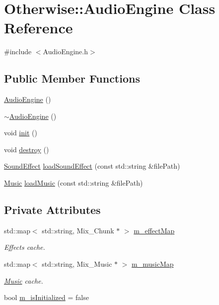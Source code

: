 \hypertarget{class_otherwise_1_1_audio_engine}{}\section{Otherwise\+:\+:Audio\+Engine Class Reference}
\label{class_otherwise_1_1_audio_engine}


{\ttfamily \#include $<$Audio\+Engine.\+h$>$}

\subsection*{Public Member Functions}
\begin{DoxyCompactItemize}
\item 
\hyperlink{class_otherwise_1_1_audio_engine_a9619c7bc4df7bdd03d35259db9ba59b7}{Audio\+Engine} ()
\item 
\hyperlink{class_otherwise_1_1_audio_engine_a4fb770e6d48751d3022512713da1c2aa}{$\sim$\+Audio\+Engine} ()
\item 
void \hyperlink{class_otherwise_1_1_audio_engine_a11a6f68e79f200d67f69bbc415f5b897}{init} ()
\item 
void \hyperlink{class_otherwise_1_1_audio_engine_a3db329073224b45ea102d52ab3e9e3a1}{destroy} ()
\item 
\hyperlink{class_otherwise_1_1_sound_effect}{Sound\+Effect} \hyperlink{class_otherwise_1_1_audio_engine_a5b26ed2abe4daf8149dff94119383458}{load\+Sound\+Effect} (const std\+::string \&file\+Path)
\item 
\hyperlink{class_otherwise_1_1_music}{Music} \hyperlink{class_otherwise_1_1_audio_engine_a61860774e93a6ec5bd3b5074427d0100}{load\+Music} (const std\+::string \&file\+Path)
\end{DoxyCompactItemize}
\subsection*{Private Attributes}
\begin{DoxyCompactItemize}
\item 
std\+::map$<$ std\+::string, Mix\+\_\+\+Chunk $\ast$ $>$ \hyperlink{class_otherwise_1_1_audio_engine_ab31977a54a21323685bdd872b0963b99}{m\+\_\+effect\+Map}
\begin{DoxyCompactList}\small\item\em Effects cache. \end{DoxyCompactList}\item 
std\+::map$<$ std\+::string, Mix\+\_\+\+Music $\ast$ $>$ \hyperlink{class_otherwise_1_1_audio_engine_ad6aa00936748793bbc2998b2d470c69c}{m\+\_\+music\+Map}
\begin{DoxyCompactList}\small\item\em \hyperlink{class_otherwise_1_1_music}{Music} cache. \end{DoxyCompactList}\item 
bool \hyperlink{class_otherwise_1_1_audio_engine_a7495688329bbc74b5ebe39c84e782463}{m\+\_\+is\+Initialized} = false
\end{DoxyCompactItemize}


